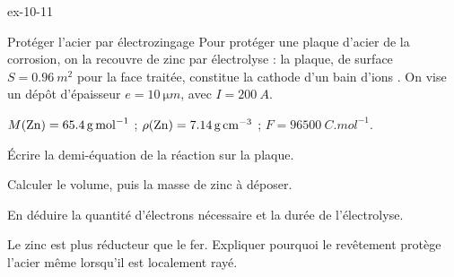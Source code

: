 \begin{blocLivre}{ex-10-11}
\begin{exercice}[2]{Protéger l'acier par électrozingage}
Pour protéger une plaque d'acier de la corrosion, on la recouvre de zinc par électrolyse : la plaque, de surface
$S=\qty{0,96}{m^2}$ pour la face traitée, constitue la cathode d'un bain d'ions . On vise un dépôt
d'épaisseur $e=\qty{10}{\micro m}$, avec $I=\qty{200}{A}$.
\begin{donnees}
$M(\ce{Zn})=\qty{65,4}{g.mol^{-1}}$ ; $\rho(\ce{Zn})=\qty{7,14}{g.cm^{-3}}$ ; $F=\qty{96500}{C.mol^{-1}}$.
\end{donnees}
\begin{questions}
\item Écrire la demi-équation de la réaction sur la plaque.
\item Calculer le volume, puis la masse de zinc à déposer.
\item En déduire la quantité d'électrons nécessaire et la durée de l'électrolyse.
\item Le zinc est plus réducteur que le fer. Expliquer pourquoi le revêtement protège l'acier même lorsqu'il est
localement rayé.
\end{questions}
\end{exercice}
\end{blocLivre}
